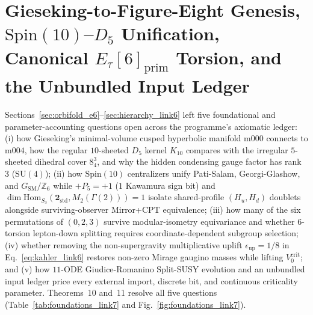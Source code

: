 \documentclass[aps,prd,twocolumn,nofootinbib,floatfix]{revtex4-2}
\begin{document}
\section{Gieseking-to-Figure-Eight Genesis, \texorpdfstring{$\mathrm{Spin}(10)$--$D_5$}{Spin(10)-D5} Unification, Canonical \texorpdfstring{$E_\tau[6]_{\mathrm{prim}}$}{E_tau[6]_prim} Torsion, and the Unbundled Input Ledger}
\label{sec:foundations_link7}

Sections~\ref{sec:orbifold_e6}--\ref{sec:hierarchy_link6} left five foundational and parameter-accounting questions open across the programme's axiomatic ledger: (i) how Gieseking's minimal-volume cusped hyperbolic manifold $\mathrm{m000}$ connects to $\mathrm{m004}$, how the regular $10$-sheeted $D_5$ kernel $K_{10}$ compares with the irregular $5$-sheeted dihedral cover $8^3_4$, and why the hidden condensing gauge factor has rank $3$ ($\mathrm{SU}(4)$); (ii) how $\mathrm{Spin}(10)$ centralizers unify Pati-Salam, Georgi-Glashow, and $G_{\mathrm{SM}}/\mathbb{Z}_6$ while $+P_5 = +1$ ($1$ Kawamura sign bit) and $\dim\mathrm{Hom}_{S_3}(\mathbf{2}_{\mathrm{std}}, M_2(\Gamma(2))) = 1$ isolate shared-profile $(H_u, H_d)$ doublets alongside surviving-observer Mirror+CPT equivalence; (iii) how many of the six permutations of $(0,2,3)$ survive modular-isometry equivariance and whether $6$-torsion lepton-down splitting requires coordinate-dependent subgroup selection; (iv) whether removing the non-supergravity multiplicative uplift $\epsilon_{\mathrm{up}} = 1/8$ in Eq.~\eqref{eq:kahler_link6} restores non-zero Mirage gaugino masses while lifting $V_0^{\mathrm{crit}}$; and (v) how $11$-ODE Giudice-Romanino Split-SUSY evolution and an unbundled input ledger price every external import, discrete bit, and continuous criticality parameter. Theorems~10 and~11 resolve all five questions (Table~\ref{tab:foundations_link7} and Fig.~\ref{fig:foundations_link7}).
\end{document}
